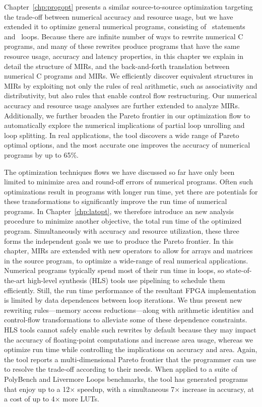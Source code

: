 Chapter~\ref{chp:progopt} presents a similar source-to-source optimization
targeting the trade-off between numerical accuracy and resource usage, but
we have extended it to optimize general numerical programs, consisting of
\iflit~statements and \whilelit~loops.  Because there are infinite number
of ways to rewrite numerical C programs, and many of these rewrites produce
programs that have the same resource usage, accuracy and latency properties, in
this chapter we explain in detail the structure of MIRs, and the back-and-forth
translation between numerical C programs and MIRs.  We efficiently discover
equivalent structures in MIRs by exploiting not only the rules of real
arithmetic, such as associativity and distributivity, but also rules that
enable control flow restructuring.  Our numerical accuracy and resource usage
analyses are further extended to analyze MIRs.  Additionally, we further
broaden the Pareto frontier in our optimization flow to automatically explore
the numerical implications of partial loop unrolling and loop splitting.  In
real applications, the tool discovers a wide range of Pareto optimal options,
and the most accurate one improves the accuracy of numerical programs by up to
65\%.

The optimization techniques flows we have discussed so far have only been
limited to minimize area and round-off errors of numerical programs.  Often
such optimizations result in programs with longer run time, yet there are
potentials for these transformations to significantly improve the run time of
numerical programs.  In Chapter~\ref{chp:latopt}, we therefore introduce an
new analysis procedure to minimize another objective, the total run time of
the optimized program.  Simultaneously with accuracy and resource utilization,
these three forms the independent goals we use to produce the Pareto frontier.
In this chapter, MIRs are extended with new operators to allow for arrays and
matrices in the source program, to optimize a wide-range of real numerical
applications.  Numerical programs typically spend most of their run time in
loops, so state-of-the-art high-level synthesis (HLS) tools use pipelining to
schedule them efficiently.  Still, the run time performance of the resultant
FPGA implementation is limited by data dependences between loop iterations.
We thus present new rewriting rules---memory access reductions---along with
arithmetic identities and control-flow transformations to alleviate some of
these dependence constraints.  HLS tools cannot safely enable such rewrites by
default because they may impact the accuracy of floating-point computations
and increase area usage, whereas we optimize run time while controlling the
implications on accuracy and area.  Again, the tool reports a multi-dimensional
Pareto frontier that the programmer can use to resolve the trade-off according
to their needs.  When applied to a suite of PolyBench and Livermore Loops
benchmarks, the tool has generated programs that enjoy up to a 12$\times$
speedup, with a simultaneous 7$\times$ increase in accuracy, at a cost of up to
4$\times$ more LUTs.

